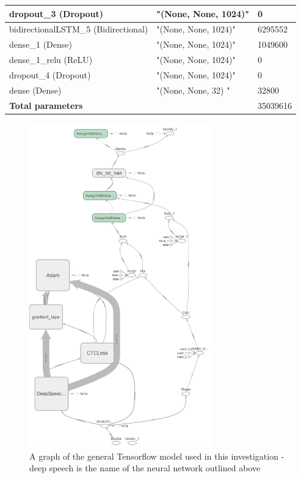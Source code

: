 \begin{table}[!ht]
\begin{tabular}{|l|l|l|}
        dropout\_3 (Dropout) & "(None, None, 1024)" & 0 \\ \hline
        bidirectionalLSTM\_5 (Bidirectional) & "(None, None, 1024)" & 6295552 \\ \hline
        dense\_1 (Dense) & "(None, None, 1024)" & 1049600 \\ \hline
        dense\_1\_relu (ReLU) & "(None, None, 1024)" & 0 \\ \hline
        dropout\_4 (Dropout) & "(None, None, 1024)" & 0 \\ \hline
        dense (Dense) & "(None, None, 32) " & 32800 \\ \hline
        \textbf{Total parameters} & ~ & 35039616 \\ \hline
    \end{tabular}
    \label{model}
\end{table}

\begin{figure}[th]
    \centering
    \includegraphics[width=0.7\textwidth]{Figures/model.png}
    \caption[TensorflowModelGraph]{A graph of the general Tensorflow model used in this investigation - deep speech is the name of the neural network outlined above}
    \label{fig:TensorflowModelGraph}
\end{figure}
